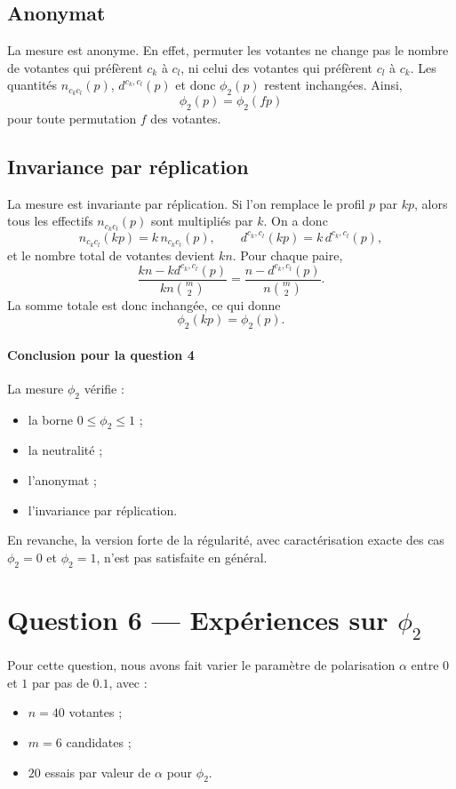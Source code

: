 \documentclass[11pt,a4paper]{article}
\begin{document}
\subsection*{Anonymat}

La mesure est anonyme. En effet, permuter les votantes ne change pas le nombre de votantes qui pr\'ef\`erent \(c_k\) \`a \(c_l\), ni celui des votantes qui pr\'ef\`erent \(c_l\) \`a \(c_k\). Les quantit\'es \(n_{c_kc_l}(p)\), \(d^{c_k,c_l}(p)\) et donc \(\phi_2(p)\) restent inchang\'ees. Ainsi,
\[
\phi_2(p)=\phi_2(fp)
\]
pour toute permutation \(f\) des votantes.

\subsection*{Invariance par r\'eplication}

La mesure est invariante par r\'eplication. Si l'on remplace le profil \(p\) par \(kp\), alors tous les effectifs \(n_{c_kc_l}(p)\) sont multipli\'es par \(k\). On a donc
\[
n_{c_kc_l}(kp)=k\,n_{c_kc_l}(p), \qquad d^{c_k,c_l}(kp)=k\,d^{c_k,c_l}(p),
\]
et le nombre total de votantes devient \(kn\). Pour chaque paire,
\[
\frac{kn-kd^{c_k,c_l}(p)}{kn\binom{m}{2}}=\frac{n-d^{c_k,c_l}(p)}{n\binom{m}{2}}.
\]
La somme totale est donc inchang\'ee, ce qui donne
\[
\phi_2(kp)=\phi_2(p).
\]

\paragraph{Conclusion pour la question 4}
La mesure \(\phi_2\) v\'erifie :
\begin{itemize}[leftmargin=*]
    \item la borne \(0 \le \phi_2 \le 1\) ;
    \item la neutralit\'e ;
    \item l'anonymat ;
    \item l'invariance par r\'eplication.
\end{itemize}
En revanche, la version forte de la r\'egularit\'e, avec caract\'erisation exacte des cas \(\phi_2=0\) et \(\phi_2=1\), n'est pas satisfaite en g\'en\'eral.

\section{Question 6 --- Exp\'eriences sur \texorpdfstring{$\phi_2$}{phi2}}

Pour cette question, nous avons fait varier le param\`etre de polarisation \(\alpha\) entre \(0\) et \(1\) par pas de \(0.1\), avec :
\begin{itemize}[leftmargin=*]
    \item \(n = 40\) votantes ;
    \item \(m = 6\) candidates ;
    \item \(20\) essais par valeur de \(\alpha\) pour \(\phi_2\).
\end{itemize}
\end{document}
